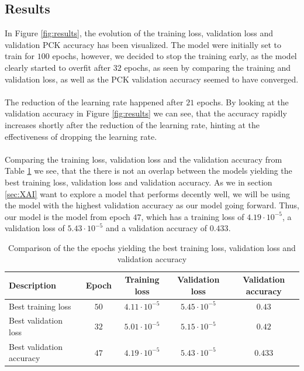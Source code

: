 \documentclass[./main.tex]{subfiles}
\begin{document}
\subsection{Results}\label{subsec:results}
In Figure \ref{fig:results}, the evolution of the training loss, validation loss and validation PCK accuracy has been visualized. The model were initially set to train for $100$ epochs, however, we decided to stop the training early, as the model clearly started to overfit after $32$ epochs, as seen by comparing the training and validation loss, as well as the PCK validation accuracy seemed to have converged.
\\
\\
The reduction of the learning rate happened after $21$ epochs. By looking at the validation accuracy in Figure \ref{fig:results} we can see, that the accuracy rapidly increases shortly after the reduction of the learning rate, hinting at the effectiveness of dropping the learning rate. 
\\
\\
Comparing the training loss, validation loss and the validation accuracy from Table \ref{tab:results} we see, that the there is not an overlap between the models yielding the best training loss, validation loss and validation accuracy. As we in section \ref{sec:XAI} want to explore a model that performs decently well, we will be using the model with the highest validation accuracy as our model going forward. Thus, our model is the model from epoch $47$, which has a training loss of $4.19 \cdot 10^{-5}$, a validation loss of $5.43 \cdot 10^{-5}$ and a validation accuracy of $0.433$.
\begin{table}[b]
    \centering
    \begin{tabular}{|l|c|c|c|c|}
        \hline
        \textbf{Description} & \textbf{Epoch} & \textbf{Training loss} & \textbf{Validation loss} & \textbf{Validation accuracy} \\
        \hline
        Best training loss & $50$ & $4.11 \cdot 10^{-5}$ & $5.45 \cdot 10^{-5}$ & $0.43$ \\
        \hline
        Best validation loss & $32$ & $5.01 \cdot 10^{-5}$ & $5.15 \cdot 10^{-5}$ & $0.42$ \\
        \hline
        Best validation accuracy & $47$ & $4.19 \cdot 10^{-5}$ & $5.43 \cdot 10^{-5}$  & $0.433$ \\
        \hline
    \end{tabular}
    \caption{Comparison of the the epochs yielding the best training loss, validation loss and validation accuracy}
    \label{tab:results}
\end{table}
\end{document}
